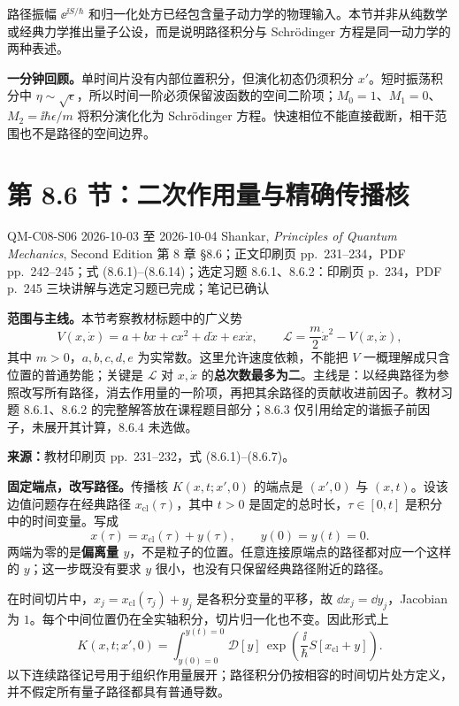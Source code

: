 路径振幅 $\ee^{\ii S/\hbar}$ 和归一化处方已经包含量子动力学的物理输入。本节并非从纯数学或经典力学推出量子公设，而是说明路径积分与 Schrödinger 方程是同一动力学的两种表述。

\textbf{一分钟回顾。}单时间片没有内部位置积分，但演化初态仍须积分 $x'$。短时振荡积分中 $\eta\sim\sqrt{\epsilon}$，所以时间一阶必须保留波函数的空间二阶项；$M_0=1$、$M_1=0$、$M_2=\ii\hbar\epsilon/m$ 将积分演化化为 Schrödinger 方程。快速相位不能直接截断，相干范围也不是路径的空间边界。

\section{第 8.6 节：二次作用量与精确传播核}
\label{section:QM-C08-S06}
\studymeta
  {QM-C08-S06}
  {2026-10-03 至 2026-10-04}
  {Shankar, \textit{Principles of Quantum Mechanics}, Second Edition}
  {第 8 章 \S 8.6；正文印刷页 pp.~231--234，PDF pp.~242--245；式 (8.6.1)--(8.6.14)；选定习题 8.6.1、8.6.2：印刷页 p.~234，PDF p.~245}
  {三块讲解与选定习题已完成；笔记已确认}

\textbf{范围与主线。}本节考察教材标题中的广义势
\begin{equation}
  V(x,\dot x)=a+bx+cx^2+d\dot x+ex\dot x,
  \qquad \mathcal L=\frac m2\dot x^2-V(x,\dot x),
\end{equation}
其中 $m>0$，$a,b,c,d,e$ 为实常数。这里允许速度依赖，不能把 $V$ 一概理解成只含位置的普通势能；关键是 $\mathcal L$ 对 $x,\dot x$ 的\textbf{总次数最多为二}。主线是：以经典路径为参照改写所有路径，消去作用量的一阶项，再把其余路径的贡献收进前因子。教材习题 8.6.1、8.6.2 的完整解答放在课程题目部分；8.6.3 仅引用给定的谐振子前因子，未展开其计算，8.6.4 未选做。

\textbf{来源：}教材印刷页 pp.~231--232，式 (8.6.1)--(8.6.7)。

\textbf{固定端点，改写路径。}传播核 $K(x,t;x',0)$ 的端点是 $(x',0)$ 与 $(x,t)$。设该边值问题存在经典路径 $x_{\mathrm{cl}}(\tau)$，其中 $t>0$ 是固定的总时长，$\tau\in[0,t]$ 是积分中的时间变量。写成
\begin{equation}
  x(\tau)=x_{\mathrm{cl}}(\tau)+y(\tau),\qquad
  \boxed{y(0)=y(t)=0}.
\end{equation}
两端为零的是\textbf{偏离量 $y$}，不是粒子的位置。任意连接原端点的路径都对应一个这样的 $y$；这一步既没有要求 $y$ 很小，也没有只保留经典路径附近的路径。

在时间切片中，$x_j=x_{\mathrm{cl}}(\tau_j)+y_j$ 是各积分变量的平移，故 $\dd x_j=\dd y_j$，Jacobian 为 $1$。每个中间位置仍在全实轴积分，切片归一化也不变。因此形式上
\begin{equation}
  K(x,t;x',0)=\int_{y(0)=0}^{y(t)=0}\mathcal D[y]\,
  \exp\!\left(\frac{\ii}{\hbar}S[x_{\mathrm{cl}}+y]\right).
\end{equation}
以下连续路径记号用于组织作用量展开；路径积分仍按相容的时间切片处方定义，并不假定所有量子路径都具有普通导数。


